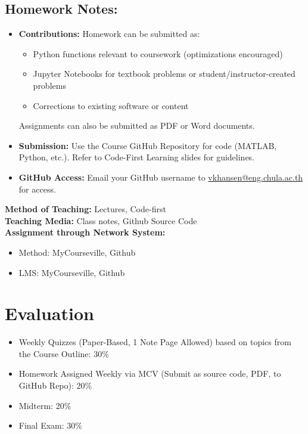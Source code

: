 \documentclass{article}
\begin{document}
\begin{enumerate}
\subsection*{Homework Notes:}
\begin{itemize}
    \item \textbf{Contributions:} Homework can be submitted as:
        \begin{itemize}
            \item Python functions relevant to coursework (optimizations encouraged)
            \item Jupyter Notebooks for textbook problems or student/instructor-created problems
            \item Corrections to existing software or content
        \end{itemize}
        Assignments can also be submitted as PDF or Word documents.
    \item \textbf{Submission:} Use the Course GitHub Repository for code (MATLAB, Python, etc.). Refer to Code-First Learning slides for guidelines.
    \item \textbf{GitHub Access:} Email your GitHub username to \href{mailto:vkhansen@eng.chula.ac.th}{vkhansen@eng.chula.ac.th} for access.
\end{itemize}

        \textbf{Method of Teaching:} Lectures, Code-first \\
        \textbf{Teaching Media:} Class notes, Github Source Code \\
        \textbf{Assignment through Network System:}
        \begin{itemize}
            \item Method: MyCourseville, Github
            \item LMS: MyCourseville, Github
        \end{itemize}

\section*{Evaluation}
\begin{itemize}
    \item Weekly Quizzes (Paper-Based, 1 Note Page Allowed) based on topics from the Course Outline: 30\%
    \item Homework Assigned Weekly via MCV (Submit as source code, PDF, to GitHub Repo): 20\%
    \item Midterm: 20\%
    \item Final Exam: 30\%
\end{itemize}


\end{enumerate}
\end{document}
